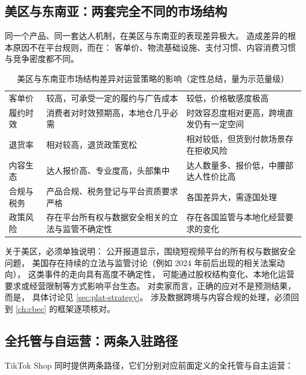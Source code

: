 \subsection{美区与东南亚：两套完全不同的市场结构}

同一个产品、同一套达人机制，在美区与东南亚的表现差异极大。
造成差异的根本原因不在平台规则，而在：
客单价、物流基础设施、支付习惯、内容消费习惯与竞争密度都不同。

\begin{table}[htbp]
\centering
\caption{美区与东南亚市场结构差异对运营策略的影响（定性总结，量为示范量级）}
\label{tab:tt-region}
\small
\begin{tabularx}{\textwidth}{L{2.4cm} Y Y}
\toprule
{} &  &  \\
\midrule
客单价 & 较高，可承受一定的履约与广告成本 & 较低，价格敏感度极高 \\
\addlinespace
履约时效 & 消费者对时效预期高，本地仓几乎必需 & 时效容忍度相对更高，跨境直发仍有一定空间 \\
\addlinespace
退货率 & 相对较高，退货政策宽松 & 相对较低，但货到付款场景存在拒收风险 \\
\addlinespace
内容生态 & 达人报价高、专业度高，头部集中 & 达人数量多、报价低，中腰部达人性价比高 \\
\addlinespace
合规与税务 & 产品合规、税务登记与平台资质要求严格 & 各国差异大，需逐国处理 \\
\addlinespace
政策风险 & 存在平台所有权与数据安全相关的立法与监管不确定性 & 存在各国监管与本地化经营要求的变化 \\
\bottomrule
\end{tabularx}
\end{table}

关于美区，必须单独说明：
公开报道显示，围绕短视频平台的所有权与数据安全问题，
美国存在持续的立法与监管讨论（例如 2024 年前后出现的相关法案动向），
这类事件的走向具有高度不确定性，
可能通过股权结构变化、本地化运营要求或经营限制等方式影响平台生态。
对卖家而言，正确的应对不是预测结果，而是，
具体讨论见 \cref{sec:plat-strategy}。
涉及数据跨境与内容合规的处理，必须回到 \cref{ch:cbec} 的框架逐项核对。

\subsection{全托管与自运营：两条入驻路径}

TikTok Shop 同时提供两条路径，它们分别对应前面定义的全托管与自主运营：

